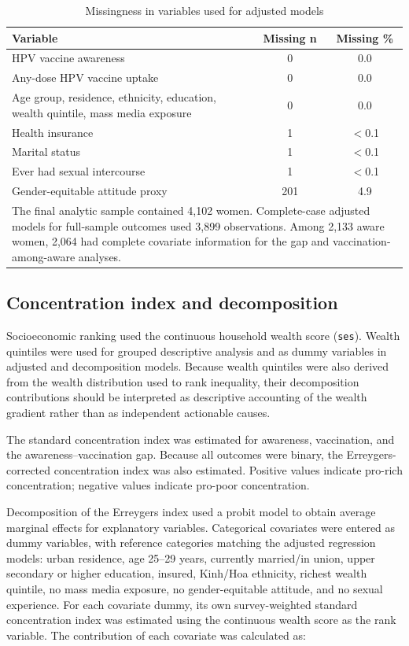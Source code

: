 \begin{table}[htbp]
\caption{Missingness in variables used for adjusted models}
\centering
\small
\begin{tabular}{|p{5.0cm}|c|c|}
\hline
\textbf{Variable} & \textbf{Missing n} & \textbf{Missing \%} \\
\hline
HPV vaccine awareness & 0 & 0.0 \\
Any-dose HPV vaccine uptake & 0 & 0.0 \\
Age group, residence, ethnicity, education, wealth quintile, mass media exposure & 0 & 0.0 \\
Health insurance & 1 & $<$0.1 \\
Marital status & 1 & $<$0.1 \\
Ever had sexual intercourse & 1 & $<$0.1 \\
Gender-equitable attitude proxy & 201 & 4.9 \\
\hline
\multicolumn{3}{|p{11.5cm}|}{\footnotesize The final analytic sample contained 4,102 women. Complete-case adjusted models for full-sample outcomes used 3,899 observations. Among 2,133 aware women, 2,064 had complete covariate information for the gap and vaccination-among-aware analyses.} \\
\hline
\end{tabular}
\label{tab:missingness}
\end{table}

\subsection{Concentration index and decomposition}

Socioeconomic ranking used the continuous household wealth score (\texttt{ses}). Wealth quintiles were used for grouped descriptive analysis and as dummy variables in adjusted and decomposition models. Because wealth quintiles were also derived from the wealth distribution used to rank inequality, their decomposition contributions should be interpreted as descriptive accounting of the wealth gradient rather than as independent actionable causes.

The standard concentration index was estimated for awareness, vaccination, and the awareness--vaccination gap. Because all outcomes were binary, the Erreygers-corrected concentration index was also estimated. Positive values indicate pro-rich concentration; negative values indicate pro-poor concentration.

Decomposition of the Erreygers index used a probit model to obtain average marginal effects for explanatory variables. Categorical covariates were entered as dummy variables, with reference categories matching the adjusted regression models: urban residence, age 25--29 years, currently married/in union, upper secondary or higher education, insured, Kinh/Hoa ethnicity, richest wealth quintile, no mass media exposure, no gender-equitable attitude, and no sexual experience. For each covariate dummy, its own survey-weighted standard concentration index was estimated using the continuous wealth score as the rank variable. The contribution of each covariate was calculated as:

